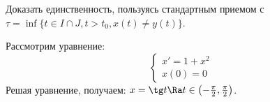 \begin{exercise}
    Доказать единственность, пользуясь стандартным приемом с \(\tau = \inf\{t \in I \cap J, t > t_0, x(t) \ne y(t)\}\).
\end{exercise}

\begin{example}
    Рассмотрим уравнение:
    \begin{equation*}
        \begin{cases}
            x' = 1 + x^2 \\
            x(0) = 0
        \end{cases}
    \end{equation*}
    Решая уравнение, получаем: \(x = \tg t \Ra t \in \left( -\frac{\pi}{2}, \frac{\pi}{2} \right)\).
\end{example}
